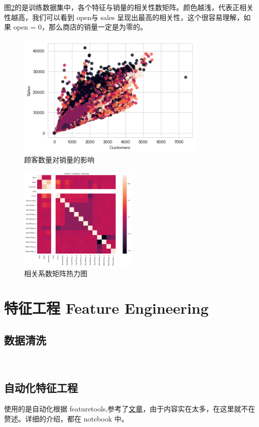 \documentclass[a4paper]{article}
\begin{document}
图\ref{fig:matrix}的是训练数据集中，各个特征与销量的相关性数矩阵。颜色越浅，代表正相关性越高，我们可以看到 open与 sales 呈现出最高的相关性，这个很容易理解，如果 open = 0，那么商店的销量一定是为零的。
\begin{figure}[ht]
 \centering
 \includegraphics[height=6cm]{images/customers.png}
 \caption{顾客数量对销量的影响}
 \label{fig:customres}
\end{figure}

\begin{figure}[ht]
 \centering
 \includegraphics[height=5cm]{images/corr-heatmap}
 \caption{相关系数矩阵热力图}
 \label{fig:matrix}
\end{figure}

\section{特征工程 Feature Engineering}\label{fe}
\subsection{数据清洗} \label{sub:clean}\
\subsection{自动化特征工程}
使用的是自动化根据 featuretools,参考了\href{https://github.com/WillKoehrsen/automated-feature-engineering/blob/master/walk_through/Automated_Feature_Engineering.ipynb}{文章}，由于内容实在太多，在这里就不在赘述。详细的介绍，都在 notebook 中。
\end{document}
